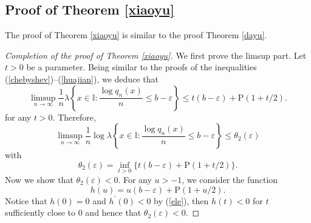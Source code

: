 \documentclass[reqno]{amsart}
\theoremstyle{definition}
\numberwithin{equation}{section}
\begin{document}
\subsection{Proof of Theorem \ref{xiaoyu}}
The proof of Theorem \ref{xiaoyu} is similar to the proof Theorem \ref{dayu}.

\begin{proof}[Completion of the proof of Theorem \ref{xiaoyu}]
We first prove the limsup part. Let $t >0$ be a parameter. Being similar to the proofs of the inequalities (\ref{chebyshev})--(\ref{huajian}), we deduce that
\begin{equation*}
\limsup_{n \to \infty} \frac{1}{n}\lambda \left\{x \in \mathbb{I}: \frac{\log q_n(x)}{n} \leq b - \varepsilon\right\} \leq t(b - \varepsilon) + \mathrm{P}(1+t/2).
\end{equation*}
for any $t>0$. Therefore,
\begin{equation*}
\limsup_{n \to \infty} \frac{1}{n}\log \lambda \left\{x \in \mathbb{I}: \frac{\log q_n(x)}{n} \leq b - \varepsilon\right\} \leq \theta_2(\varepsilon)
\end{equation*}
with
\[
\theta_2(\varepsilon) = \inf_{t> 0}\big\{t(b - \varepsilon) + \mathrm{P}(1+t/2)\big\}.
\]
Now we show that $\theta_2(\varepsilon) < 0$. For any $u >-1$, we consider the function
\[
h(u)= u(b - \varepsilon) + \mathrm{P}(1+u/2).
\]
Notice that $h(0) =0$ and $h^{\prime}(0) <0$ by (\ref{ele}), then $h(t) < 0$ for $t$ sufficiently close to $0$ and hence that $\theta_2(\varepsilon) < 0$.


\end{proof}
\end{document}
